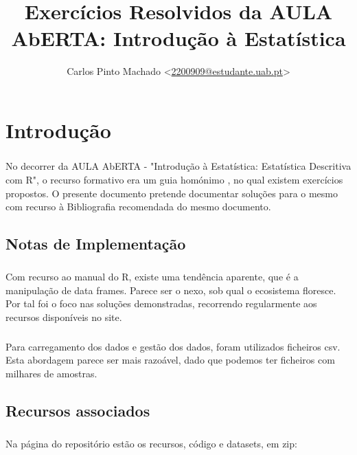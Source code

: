 \documentclass[11pt,a4paper]{report}
\author{Carlos Pinto Machado
	<\href{mailto:2200909@estudante.uab.pt}{2200909@estudante.uab.pt}>}
\title{Exercícios Resolvidos da AULA AbERTA: Introdução à Estatística}
\begin{document}
\maketitle
\tableofcontents

\chapter{Introdução}

\paragraph{} No decorrer da AULA AbERTA - "Introdução à Estatística:
Estatística Descritiva com R"\cite{AulaAbertaIntroducaoEstatistica2017}, o
recurso formativo era um guia homónimo
\cite{OliveiraAulaAberta2017}, no qual existem
exercícios propostos. O presente documento pretende documentar soluções para o
mesmo com recurso à Bibliografia recomendada do mesmo
documento\cite{OliveiraEstatisticaDescritiva2011}.

\section{Notas de Implementação}

\paragraph{} Com recurso ao manual do R\cite{RManual}, existe uma tendência
aparente, que é a manipulação de data frames. Parece ser o nexo, sob qual o
ecosistema floresce. Por tal foi o foco nas soluções demonstradas, recorrendo
regularmente aos recursos disponíveis no site.

\paragraph{} Para carregamento dos dados e gestão dos dados, foram utilizados
ficheiros csv. Esta abordagem parece ser mais razoável, dado que
podemos ter ficheiros com milhares de amostras.


\section{Recursos associados}

\paragraph{} Na página do repositório\cite{a2edRRepo}
estão os recursos, código e datasets, em zip:
\end{document}

